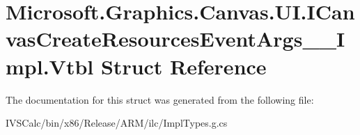 \hypertarget{struct_microsoft_1_1_graphics_1_1_canvas_1_1_u_i_1_1_i_canvas_create_resources_event_args_____impl_1_1_vtbl}{}\section{Microsoft.\+Graphics.\+Canvas.\+U\+I.\+I\+Canvas\+Create\+Resources\+Event\+Args\+\_\+\+\_\+\+Impl.\+Vtbl Struct Reference}
\label{struct_microsoft_1_1_graphics_1_1_canvas_1_1_u_i_1_1_i_canvas_create_resources_event_args_____impl_1_1_vtbl}


The documentation for this struct was generated from the following file\+:\begin{DoxyCompactItemize}
\item 
I\+V\+S\+Calc/bin/x86/\+Release/\+A\+R\+M/ilc/Impl\+Types.\+g.\+cs\end{DoxyCompactItemize}
